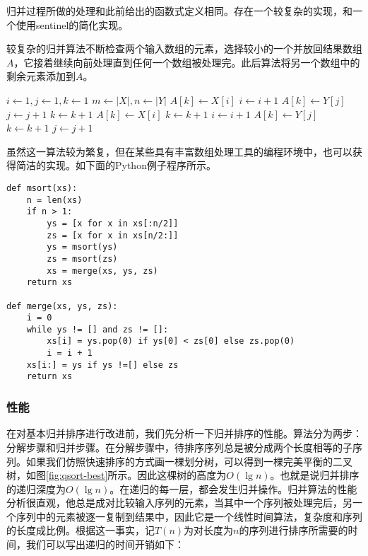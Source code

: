 \documentclass[UTF8]{article}
\begin{document}
归并过程所做的处理和此前给出的函数式定义相同。存在一个较复杂的实现，和一个使用sentinel的简化实现。

较复杂的归并算法不断检查两个输入数组的元素，选择较小的一个并放回结果数组$A$，它接着继续向前处理直到任何一个数组被处理完。此后算法将另一个数组中的剩余元素添加到$A$。

\begin{algorithmic}[1]
  \State $i \gets 1, j\gets 1, k\gets 1$
  \State $m \gets |X|, n \gets |Y|$
      \State $A[k] \gets X[i]$
      \State $i \gets i + 1$
    \Else
      \State $A[k] \gets Y[j]$
      \State $j \gets j + 1$
    \EndIf
    \State $k \gets k + 1$
  \EndWhile
    \State $A[k] \gets X[i]$
    \State $k \gets k + 1$
    \State $i \gets i + 1$
  \EndWhile
    \State $A[k] \gets Y[j]$
    \State $k \gets k + 1$
    \State $j \gets j + 1$
  \EndWhile
\EndProcedure
\end{algorithmic}

虽然这一算法较为繁复，但在某些具有丰富数组处理工具的编程环境中，也可以获得简洁的实现。如下面的Python例子程序所示。

\lstset{language=Python}
\begin{lstlisting}
def msort(xs):
    n = len(xs)
    if n > 1:
        ys = [x for x in xs[:n/2]]
        zs = [x for x in xs[n/2:]]
        ys = msort(ys)
        zs = msort(zs)
        xs = merge(xs, ys, zs)
    return xs

def merge(xs, ys, zs):
    i = 0
    while ys != [] and zs != []:
        xs[i] = ys.pop(0) if ys[0] < zs[0] else zs.pop(0)
        i = i + 1
    xs[i:] = ys if ys !=[] else zs
    return xs
\end{lstlisting}

\subsubsection{性能}

在对基本归并排序进行改进前，我们先分析一下归并排序的性能。算法分为两步：分解步骤和归并步骤。在分解步骤中，待排序序列总是被分成两个长度相等的子序列。如果我们仿照快速排序的方式画一棵划分树，可以得到一棵完美平衡的二叉树，如图\ref{fig:qsort-best}所示。因此这棵树的高度为$O(\lg n)$。也就是说归并排序的递归深度为$O(\lg n)$。在递归的每一层，都会发生归并操作。归并算法的性能分析很直观，他总是成对比较输入序列的元素，当其中一个序列被处理完后，另一个序列中的元素被逐一复制到结果中，因此它是一个线性时间算法，复杂度和序列的长度成比例。根据这一事实，记$T(n)$为对长度为$n$的序列进行排序所需要的时间，我们可以写出递归的时间开销如下：
\end{document}
